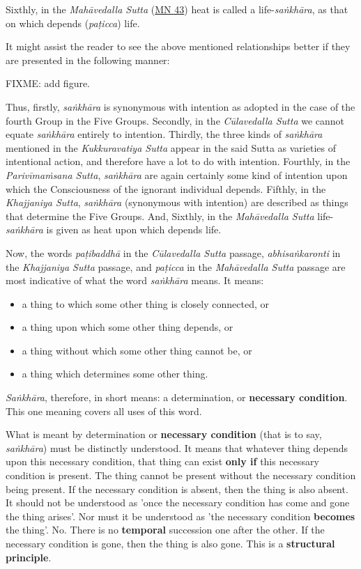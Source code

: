 Sixthly, in the \emph{Mahāvedalla Sutta} (\href{https://suttacentral.net/mn43/en/sujato}{MN 43}) heat is called a life-\emph{saṅkhāra},
as that on which depends (\emph{paṭicca}) life.


It might assist the reader to see the above mentioned relationships
better if they are presented in the following manner:


FIXME: add figure.


Thus, firstly, \emph{saṅkhāra} is synonymous with intention as adopted in the
case of the fourth Group in the Five Groups. Secondly, in the
\emph{Cūlavedalla Sutta} we cannot equate \emph{saṅkhāra} entirely to intention.
Thirdly, the three kinds of \emph{saṅkhāra} mentioned in the \emph{Kukkuravatiya
Sutta} appear in the said Sutta as varieties of intentional action,
and therefore have a lot to do with intention. Fourthly, in the
\emph{Parivīmaṁsana Sutta}, \emph{saṅkhāra} are again certainly some kind of
intention upon which the Consciousness of the ignorant individual
depends. Fifthly, in the \emph{Khajjaniya Sutta}, \emph{saṅkhāra} (synonymous
with intention) are described as things that determine the Five Groups.
And, Sixthly, in the \emph{Mahāvedalla Sutta} life-\emph{saṅkhāra} is given as
heat upon which depends life.


Now, the words \emph{paṭibaddhā} in the \emph{Cūlavedalla Sutta} passage,
\emph{abhisaṅkaronti} in the \emph{Khajjaniya Sutta} passage, and \emph{paṭicca} in the
\emph{Mahāvedalla Sutta} passage are most indicative of what the word
\emph{saṅkhāra} means. It means:


\begin{itemize}

\item a thing to which some other thing is closely connected, or

\item a thing upon which some other thing depends, or

\item a thing without which some other thing cannot be, or

\item a thing which determines some other thing.

\end{itemize}


\emph{Saṅkhāra}, therefore, in short means: a determination,
or \textbf{necessary condition}. This one meaning covers all uses of this word.


What is meant by determination or \textbf{necessary condition} (that is to say,
\emph{saṅkhāra}) must be distinctly understood. It means that whatever
thing depends upon this necessary condition, that thing can exist \textbf{only if}
this necessary condition is present. The thing cannot be present
without the necessary condition being present. If the necessary
condition is absent, then the thing is also absent. It should not be
understood as 'once the necessary condition has come and gone the thing
arises'. Nor must it be understood as 'the necessary condition \textbf{becomes}
the thing'. No. There is no \textbf{temporal} succession one after the other. If
the necessary condition is gone, then the thing is also gone. This is a
\textbf{structural principle}.


